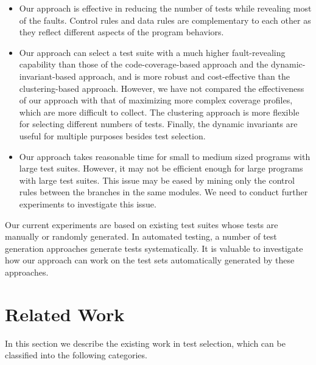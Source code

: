 \documentclass{sig-alternate}
\begin{document}
\begin{itemize}
\item \vspace{-0.1in}
Our approach is effective in reducing the number of tests while
revealing most of the faults. Control rules and data rules are
complementary to each other as they reflect different aspects of the
program behaviors.


\item \vspace{-0.1in}
Our approach can select a test suite with a much higher
fault-revealing capability than those of the code-coverage-based
approach and the dynamic-invariant-based approach, and is more
robust and cost-effective than the clustering-based approach.
However, we have not compared the effectiveness of our approach with
that of maximizing more complex coverage profiles, which are more
difficult to collect. The clustering approach is more flexible for
selecting different numbers of tests. Finally, the dynamic
invariants are useful for multiple purposes besides test selection.
\item \vspace{-0.1in}
Our approach takes reasonable time for small to medium sized
programs with large test suites. However, it may not be efficient
enough for large programs with large test suites. This issue may be
eased by mining only the control rules between the branches in the
same modules. We need to conduct further experiments to investigate
this issue.
\end{itemize} \vspace{-0.1in}
Our current experiments are based on existing test suites whose
tests are manually or randomly generated. In automated testing, a
number of test generation approaches generate tests systematically.
It is valuable to investigate how our approach can work on the test
sets automatically generated by these approaches.




\vspace{-0.15in}

\section{Related Work} \label{sec:relatedwork}

In this section we describe the existing work in test selection,
which can be classified into the following categories.
\end{document}
